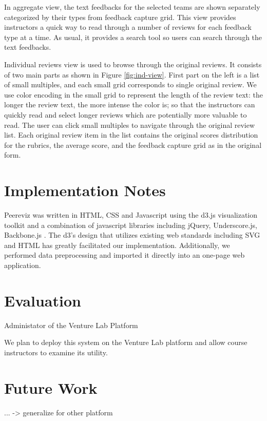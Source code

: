 \documentclass{sigchi}
\begin{document}
In aggregate view, the text feedbacks for the selected teams are shown separately categorized by their types from feedback capture grid.
This view provides instructors a quick way to read through a number of reviews
for each feedback type at a time. As usual, it provides a search tool so
users can search through the text feedbacks.

Individual reviews view is used to browse through the original reviews. It
consists of two main parts as shown in Figure \ref{fig:ind-view}. First part on the left is a list of small
multiples, and each small grid corresponds to single original review. We use color encoding in the small
grid to represent the length of the review text: the longer
the review text, the more intense the color is; so that the instructors can quickly read and select longer
reviews which are potentially more valuable to read. The user can click small
multiples to navigate through the original review list. Each original review item in the list contains the original scores distribution for the rubrics, the average score, and the feedback capture grid as in the
original form.





\section{Implementation Notes}
Peereviz was written in HTML, CSS and Javascript using the d3.js visualization
toolkit \cite{d3} and a combination of javascript libraries including jQuery,
Underscore.js, Backbone.js \cite{jquery,underscore,backbone}.
The d3’s design that utilizes
existing web standards including SVG and HTML has greatly facilitated our
implementation.  Additionally, we performed data preprocessing and imported it
directly into an one-page web application.


\section{Evaluation}

Administator of the Venture Lab Platform

We plan to deploy this system on the Venture Lab platform and allow course
instructors to examine its utility.

\section{Future Work}
... -> generalize for other platform
\end{document}
